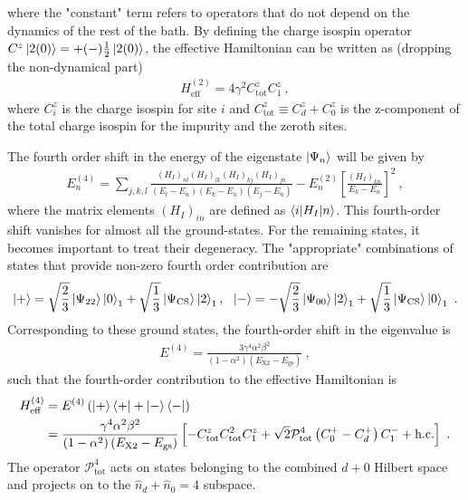 \documentclass{iopart}
\begin{document}
where the "constant" term refers to operators that do not depend on the dynamics of the rest of the bath. By defining the charge isospin operator \(C^z\ket{2(0)} = +(-)\frac{1}{2}\ket{2(0)}\), the effective Hamiltonian can be written as (dropping the non-dynamical part)
\begin{eqnarray}
	H_\text{eff}^{(2)} = 4\gamma^2C_\text{tot}^z  C_1^z~,
\end{eqnarray}
where \(C_i^z\) is the charge isospin for site \(i\) and \(C_\text{tot}^z \equiv C_d^z + C_0^z\) is the z-component of the total charge isospin for the impurity and the zeroth sites.

The fourth order shift in the energy of the eigenstate \(\ket{\Psi_n}\) will be given by
\begin{eqnarray}
	E_{n}^{(4)} = \sum_{j,k,l} \frac{\left(H_I\right)_{nl}\left(H_I\right)_{lk}\left(H_I\right)_{kj}\left(H_I\right)_{jn}}{\left( E_l - E_n \right)\left( E_k - E_n \right)\left( E_j - E_n \right) } - E_n^{(2)} \left[\frac{\left(H_I\right)_{kn}}{E_k - E_n}\right]^2~,
\end{eqnarray}
where the matrix elements \(\left( H_I \right)_{in} \) are defined as \(\braket{i | H_I | n}\). This fourth-order shift vanishes for almost all the ground-states. For the remaining states, it becomes important to treat their degeneracy. The "appropriate" combinations of states that provide non-zero fourth order contribution are
\begin{eqnarray}
	\ket{+} = \sqrt{\frac{2}{3}}\ket{\Psi_{22}}\ket{0}_1 + \sqrt{\frac{1}{3}}\ket{\Psi_\text{CS}}\ket{2}_1, ~ ~\ket{-} = -\sqrt{\frac{2}{3}}\ket{\Psi_{00}}\ket{2}_1 + \sqrt{\frac{1}{3}}\ket{\Psi_\text{CS}}\ket{0}_1~.
\end{eqnarray}
Corresponding to these ground states, the fourth-order shift in the eigenvalue is
\begin{eqnarray}
	E^{(4)} = \frac{3\gamma^4 \alpha^2 \beta^2}{\left( 1 - \alpha^2 \right) \left( E_\text{X2} - E_\text{gs} \right) }~,
\end{eqnarray}
such that the fourth-order contribution to the effective Hamiltonian is
\begin{eqnarray}
	H_\text{eff}^{(4)} &= E^{(4)}\left(\ket{+}\bra{+} + \ket{-}\bra{-}\right) \nonumber\\
			   &= \frac{\gamma^4 \alpha^2 \beta^2}{\left( 1 - \alpha^2 \right) \left( E_\text{X2} - E_\text{gs} \right) } \left[- C_\text{tot}^z C_\text{tot}^2 C_1^z +\sqrt{2}\mathcal{P}_\text{tot}^{4}\left(C_0^+ - C_d^+\right)C_1^- + \text{h.c.}\right] ~.
\end{eqnarray}
The operator \(\mathcal{P}_\text{tot}^{4}\) acts on states belonging to the combined \(d+0\) Hilbert space and projects on to the \(\hat n_d + \hat n_0 = 4\) subspace.
\end{document}
